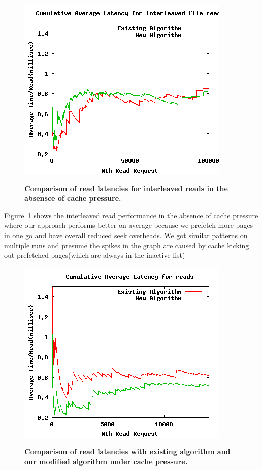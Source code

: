 \documentclass[twocolumn,10pt]{article}
\begin{document}
\begin{figure}[t!!]
\centering \resizebox{!}{2.8in}
{\includegraphics{interleave-rates-nocp.png}}
\caption{\small \bf Comparison of read latencies for interleaved reads in the absensce of cache pressure.}
\label{fig:interleave-rates-nocp}
\end{figure}

Figure~\ref{fig:interleave-rates-nocp} shows the interleaved read performance in the absence of cache pressure where our approach performs better on average because we prefetch more pages in one go and have overall reduced seek overheads. We got similar patterns on multiple runs and presume the spikes in the graph are caused by cache kicking out prefetched pages(which are always in the inactive list)

\begin{figure}[t!!]
\centering \resizebox{!}{2.8in}
{\includegraphics{cmp-avg-latency.png}}
\caption{\small \bf Comparison of read latencies with existing algorithm and
our modified algorithm under cache pressure.}
\label{fig:cmp-avg-latency}
\end{figure}
\end{document}

